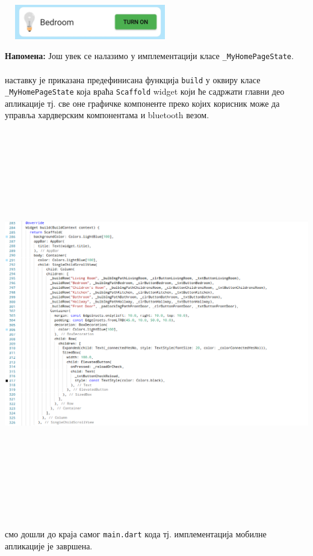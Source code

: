 \documentclass[12pt]{article}
\begin{document}
\begin{center}
    \centering 
    \includegraphics[height=1.5cm, width=7.5cm]{images/bedroomOFF}
\end{center}
\indent\indent\textbf{Напомена:} Још увек се налазимо у имплементацији класе \texttt{\_MyHomePageState}.\\\\
 наставку је приказана предефинисана функција \texttt{build} у оквиру класе \texttt{\_MyHomePageState} која враћа \texttt{Scaffold} widget који ће садржати главни део апликације тј. све оне графичке компоненте преко којих корисник може да управља хардверским компонентама и bluetooth везом.
\begin{center}
    \centering 
    \includegraphics[height=17cm, width=21cm]{images/dart10}
\end{center}
 смо дошли до краја самог \texttt{main.dart} кода тј. имплементација мобилне апликације је завршена. 
\end{document}

